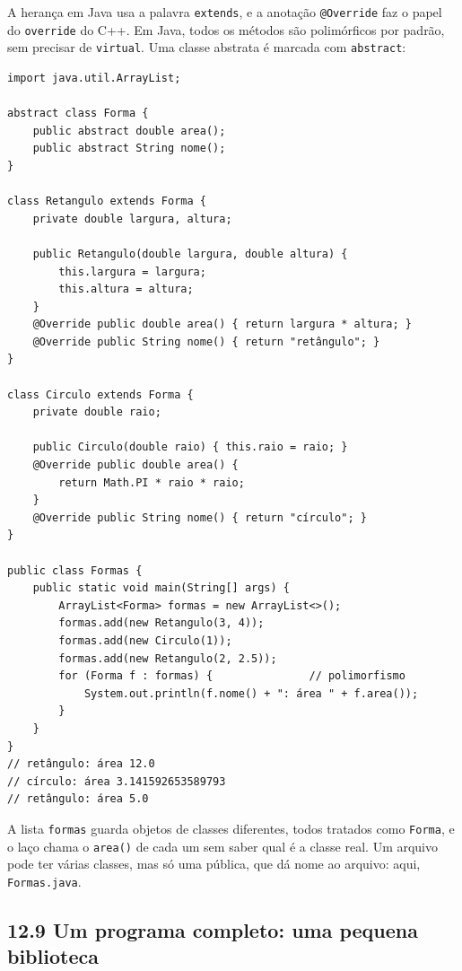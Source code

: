 A herança em Java usa a palavra \texttt{extends}, e a anotação \texttt{@Override} faz o papel do \texttt{override} do C++. Em Java, todos os métodos são polimórficos por padrão, sem precisar de \texttt{virtual}. Uma classe abstrata é marcada com \texttt{abstract}:

\begin{codigo}
\begin{Verbatim}[breaklines=true, breaksymbolleft={}, fontsize=\footnotesize]
import java.util.ArrayList;

abstract class Forma {
    public abstract double area();
    public abstract String nome();
}

class Retangulo extends Forma {
    private double largura, altura;

    public Retangulo(double largura, double altura) {
        this.largura = largura;
        this.altura = altura;
    }
    @Override public double area() { return largura * altura; }
    @Override public String nome() { return "retângulo"; }
}

class Circulo extends Forma {
    private double raio;

    public Circulo(double raio) { this.raio = raio; }
    @Override public double area() {
        return Math.PI * raio * raio;
    }
    @Override public String nome() { return "círculo"; }
}

public class Formas {
    public static void main(String[] args) {
        ArrayList<Forma> formas = new ArrayList<>();
        formas.add(new Retangulo(3, 4));
        formas.add(new Circulo(1));
        formas.add(new Retangulo(2, 2.5));
        for (Forma f : formas) {               // polimorfismo
            System.out.println(f.nome() + ": área " + f.area());
        }
    }
}
// retângulo: área 12.0
// círculo: área 3.141592653589793
// retângulo: área 5.0
\end{Verbatim}
\end{codigo}

A lista \texttt{formas} guarda objetos de classes diferentes, todos tratados como \texttt{Forma}, e o laço chama o \texttt{area()} de cada um sem saber qual é a classe real. Um arquivo pode ter várias classes, mas só uma pública, que dá nome ao arquivo: aqui, \texttt{Formas.java}.

\subsection{12.9 Um programa completo: uma pequena biblioteca}

